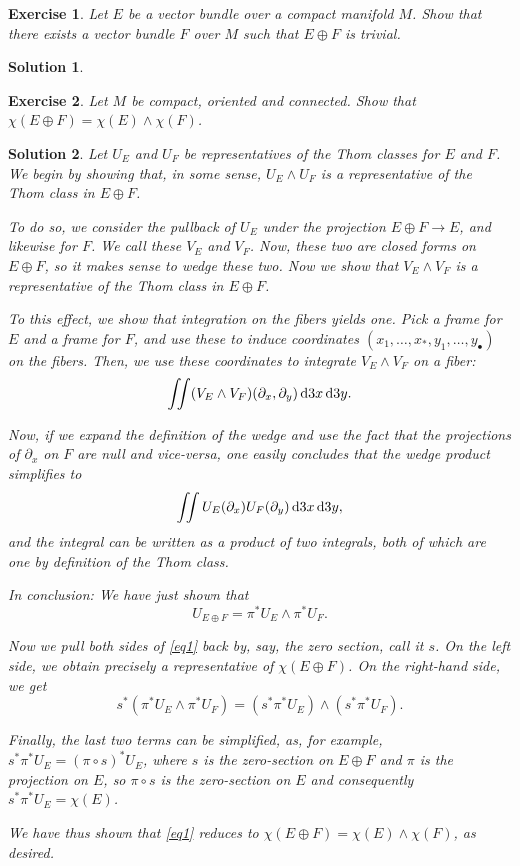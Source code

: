 \documentclass{article}
\newtheorem{ex}{Exercise}
\theoremstyle{nonumberplain}
\newtheorem{sol}{Solution}
\begin{document}
\begin{ex}
Let $E$ be a vector bundle over a compact manifold $M$. Show that there exists a vector bundle $F$ over $M$ such that $E \oplus F$ is trivial.
\end{ex}

\begin{sol}

\end{sol}

\begin{ex}
Let $M$ be compact, oriented and connected. Show that $\chi(E \oplus F) = \chi(E) \wedge \chi(F)$.
\end{ex}

\begin{sol}
Let $U_E$ and $U_F$ be representatives of the Thom classes for $E$ and $F$. We begin by showing that, in some sense, $U_E \wedge U_F$ is a representative of the Thom class in $E \oplus F$.

To do so, we consider the pullback of $U_E$ under the projection $E \oplus F \to E$, and likewise for $F$. We call these $V_E$ and $V_F$. Now, these two are closed forms on $E \oplus F$, so it makes sense to wedge these two. Now we show that $V_E \wedge V_F$ is a representative of the Thom class in $E \oplus F$.

To this effect, we show that integration on the fibers yields one. Pick a frame for $E$ and a frame for $F$, and use these to induce coordinates $(x_1, \dots, x_*, y_1, \dots, y_\bullet)$ on the fibers. Then, we use these coordinates to integrate $V_E \wedge V_F$ on a fiber:
\[\iint (V_E \wedge V_F)(\partial_x,\partial_y) \dl3x \dl3y.\]

Now, if we expand the definition of the wedge and use the fact that the projections of $\partial_x$ on $F$ are null and vice-versa, one easily concludes that the wedge product simplifies to
\[\iint U_E(\partial_x) U_F(\partial_y) \dl3x \dl3y,\]
and the integral can be written as a product of two integrals, both of which are one by definition of the Thom class.

In conclusion: We have just shown that
\begin{equation}\label{eq1}
U_{E \oplus F} = \pi^* U_E \wedge \pi^* U_F.
\end{equation}

Now we pull both sides of \eqref{eq1} back by, say, the zero section, call it $s$. On the left side, we obtain precisely a representative of $\chi(E \oplus F)$. On the right-hand side, we get
\[s^*(\pi^* U_E \wedge \pi^* U_F) = (s^* \pi^* U_E) \wedge (s^* \pi^* U_F).\]

Finally, the last two terms can be simplified, as, for example, $s^* \pi^* U_E = (\pi \circ s)^* U_E$, where $s$ is the zero-section on $E \oplus F$ and $\pi$ is the projection on $E$, so $\pi \circ s$ is the zero-section on $E$ and consequently $s^* \pi^* U_E = \chi(E)$. 

We have thus shown that \eqref{eq1} reduces to $\chi(E \oplus F) = \chi(E) \wedge \chi(F)$, as desired.
\end{sol}
\end{document}
